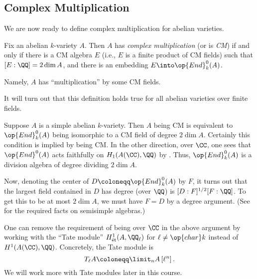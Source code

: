 \documentclass[../notes.tex]{subfiles}
\begin{document}

\subsection{Complex Multiplication}
We are now ready to define complex multiplication for abelian varieties.
\begin{definition}
	Fix an abelian $k$-variety $A$. Then $A$ has \textit{complex multiplication} (or is \textit{CM}) if and only if there is a CM algebra $E$ (i.e., $E$ is a finite product of CM fields) such that $[E:\QQ]=2\dim A$, and there is an embedding $E\into\op{End}^0_k(A)$.
\end{definition}
Namely, $A$ has ``multiplication'' by some CM fields.
\begin{remark}
	It will turn out that this definition holds true for all abelian varieties over finite fields.
\end{remark}
\begin{remark}
	Suppose $A$ is a simple abelian $k$-variety. Then $A$ being CM is equivalent to $\op{End}^0_k(A)$ being isomorphic to a CM field of degree $2\dim A$. Certainly this condition is implied by being CM. In the other direction, over $\CC$, one sees that $\op{End}^0(A)$ acts faithfully on $H_1(A(\CC),\QQ)$ by . Thus, $\op{End}^0_k(A)$ is a division algebra of degree dividing $2\dim A$.
	
	Now, denoting the center of $D\coloneqq\op{End}^0_k(A)$ by $F$, it turns out that the largest field contained in $D$ has degree (over $\QQ$) is $[D:F]^{1/2}[F:\QQ]$. To get this to be at most $2\dim A$, we must have $F=D$ by a degree argument. (See \cite[Section~I.1]{milne-cm} for the required facts on semisimple algebras.)
\end{remark}
\begin{remark}
	One can remove the requirement of being over $\CC$ in the above argument by working with the ``Tate module'' $H^1_{\text{\'et}}(A,\QQ_\ell)$ for $\ell\ne\op{char}k$ instead of $H^1(A(\CC),\QQ)$. Concretely, the Tate module is
	\[T_\ell A\coloneqq\limit_n A\left[\ell^n\right].\]
	We will work more with Tate modules later in this course.
\end{remark}
\end{document}
